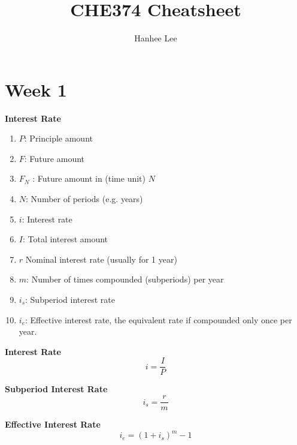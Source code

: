 \documentclass{article}
\title{CHE374 Cheatsheet}
\author{Hanhee Lee}
\begin{document}
\maketitle

\tableofcontents

\listoffigures

\listoftables

\section{Week 1}
    \begin{terminology}
        \textbf{Interest Rate}
        \begin{enumerate}
            \item \(P\): Principle amount
            \item \(F\): Future amount 
            \item \(F_N\) : Future amount in (time unit) \(N\)
            \item \(N\): Number of periods (e.g. years)
            \item \(i\): Interest rate 
            \item \(I\): Total interest amount 
            \item \(r\) Nominal interest rate (usually for 1 year)
            \item \(m\): Number of times compounded (subperiods) per year
            \item \(i_s\): Subperiod interest rate
            \item \(i_e\): Effective interest rate, the equivalent rate if compounded only once per year.
        \end{enumerate}
    \end{terminology}

    \begin{definition}
        \textbf{Interest Rate}
        \begin{equation}
            i = \frac{I}{P}
        \end{equation}
    \end{definition}

    \begin{definition}
        \textbf{Subperiod Interest Rate}
        \begin{equation}
            i_s = \frac{r}{m}
        \end{equation}
    \end{definition}

    \begin{definition}
        \textbf{Effective Interest Rate}
        \begin{equation}
            i_e = (1 + i_s)^m - 1
        \end{equation}
    \end{definition}
\end{document}
